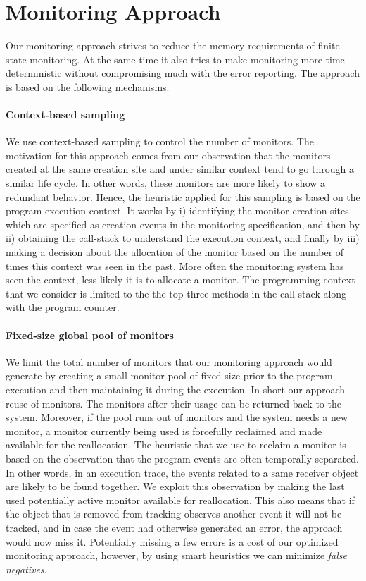 \section{Monitoring Approach}
\label{sec:approach}

Our monitoring approach strives to reduce the memory requirements of finite 
state monitoring. At the same time it also tries to make monitoring more 
time-deterministic without compromising much with the error reporting.
The approach is based on the following mechanisms.

\paragraph{Context-based sampling} We use context-based sampling to control the 
number of monitors. The motivation for this approach comes from our observation 
that the monitors created at the same creation site and under similar context 
tend to go through a similar life cycle. In other words, these monitors are more 
likely to show a redundant behavior. Hence, the heuristic applied for this 
sampling is based on the program execution context. It works by i) identifying 
the monitor creation sites which are specified as creation events in the 
monitoring specification, and then by ii) obtaining the call-stack to understand 
the execution context, and finally by iii) making a decision about the 
allocation of the monitor based on the number of times this context was seen in 
the past. More often the monitoring system has seen the context, less likely it 
is to allocate a monitor. The programming context that we consider is limited to 
the the top three methods in the call stack along with the program counter.

\paragraph{Fixed-size global pool of monitors} We limit the total number of 
monitors that our monitoring approach would generate by creating a small 
monitor-pool of fixed size prior to the program execution and then maintaining 
it during the execution. In short our approach reuse of monitors. The monitors 
after their usage can be returned back to the system. Moreover, if the pool runs 
out of monitors and the system needs a new monitor, a monitor currently being 
used is forcefully reclaimed and made available for the reallocation. The 
heuristic that we use to reclaim a monitor is based on the observation that the 
program events are often temporally separated. In other words, in an execution 
trace, the events related to a same receiver object are likely to be found 
together. We exploit this observation by making the last used potentially active 
monitor available for reallocation. This also means that if the object that is 
removed from tracking observes another event it will not be tracked, and in case 
the 
event had otherwise generated an error, the approach would now miss it. 
Potentially missing a few errors is a cost of our optimized monitoring approach, 
however, by using smart heuristics we can minimize \textit{false negatives}.


